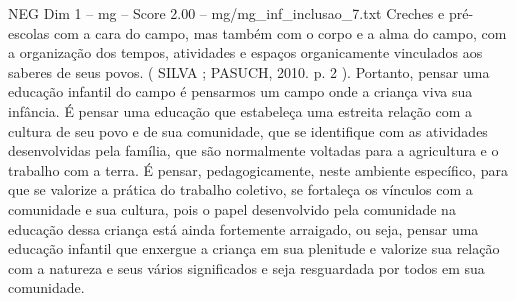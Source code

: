\begin{textsample}{NEG Dim 1 – mg – Score 2.00 – mg/mg\_inf\_inclusao\_7.txt}
Creches e pré-escolas com a cara do campo, mas também com o corpo e a alma do campo, com a organização dos tempos, atividades e espaços organicamente vinculados aos saberes de seus povos. ( SILVA ; PASUCH, 2010. p. 2 ).
Portanto, pensar uma educação infantil do campo é pensarmos um campo onde a criança viva sua infância.
É pensar uma educação que estabeleça uma estreita relação com a cultura de seu povo e de sua comunidade, que se identifique com as atividades desenvolvidas pela família, que são normalmente voltadas para a agricultura e o trabalho com a terra.
É pensar, pedagogicamente, neste ambiente específico, para que se valorize a prática do trabalho coletivo, se fortaleça os vínculos com a comunidade e sua cultura, pois o papel desenvolvido pela comunidade na educação dessa criança está ainda fortemente arraigado, ou seja, pensar uma educação infantil que enxergue a criança em sua plenitude e valorize sua relação com a natureza e seus vários significados e seja resguardada por todos em sua comunidade.

\end{textsample}

